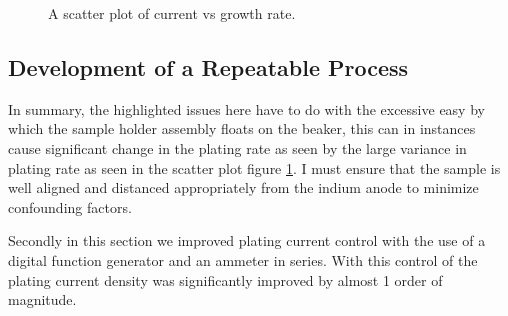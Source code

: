 \begin{figure}
    \centering
    \caption{A scatter plot of current vs growth rate.}
    \label{fig:scatterplot}
\end{figure}



\subsection{Development of a Repeatable Process}
In summary, the highlighted issues here have to do with the excessive easy by which the sample holder assembly floats on the beaker, this can in instances cause significant change in the plating rate as seen by the large variance in plating rate as seen in the scatter plot figure \ref{fig:scatterplot}. I must ensure that the sample is well aligned and distanced appropriately from the indium anode to minimize confounding factors.

Secondly in this section we improved plating current control with the use of a digital function generator and an ammeter in series. With this control of the plating current density was significantly improved by almost 1 order of magnitude.

